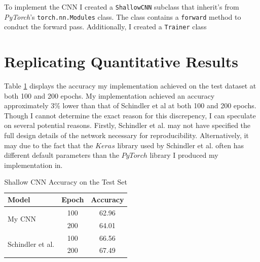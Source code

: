 \documentclass[conference]{IEEEtran}
\begin{document}
To implement the CNN I created a \texttt{ShallowCNN} subclass that inherit's from \textit{PyTorch}'s \texttt{torch.nn.Modules} class.
The class contains a \texttt{forward} method to conduct the forward pass.
Additionally, I created a \texttt{Trainer} class 

\section{Replicating Quantitative Results}

Table \ref{shallow_results} displays the accuracy my implementation achieved on the test dataset at both 100 and 200 epochs.
My implementation achieved an accuracy approximately 3\% lower than that of Schindler et al at both 100 and 200 epochs.
Though I cannot determine the exact reason for this discrepency, I can speculate on several potential reasons.
Firstly, Schindler et al. may not have specified the full design details of the network necessary for reproducibility.
Alternatively, it may due to the fact that the $Keras$ library used by Schindler et al. often has different default parameters than the $PyTorch$ library I produced my implementation in.

\begin{table}[htbp]
    \caption{Shallow CNN Accuracy on the Test Set}
    \begin{center}
    \begin{tabular}{l c c}
    \toprule
    \textbf{Model}&\textbf{Epoch}&\textbf{Accuracy}\\
    \midrule
    \multirow{ 2}{*}{My CNN} & 100 & 62.96 \\
    & 200 & 64.01 \\
    \midrule
    \multirow{ 2}{*}{Schindler et al.} & 100 & 66.56\\
    & 200 & 67.49 \\
    \bottomrule
    \end{tabular}
    \label{shallow_results}
    \end{center}
\end{table}
\end{document}
